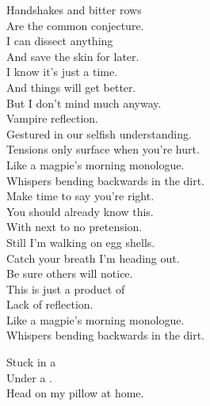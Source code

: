 


Handshakes and bitter rows \\
Are the common conjecture. \\
I can dissect anything \\
And save the skin for later. \\

I know it's just a time. \\
And things will get better. \\
But I don't mind much anyway. \\
Vampire reflection. \\

Gestured in our selfish understanding. \\
Tensions only surface when you're hurt. \\
Like a magpie's morning monologue. \\
Whispers bending backwards in the dirt. \\

Make time to say you're right. \\
You should already know this. \\
With next to no pretension. \\
Still I'm walking on egg shells. \\

Catch your breath I'm heading out. \\
Be sure others will notice. \\
This is just a product of \\
Lack of reflection. \\

Like a magpie's morning monologue. \\
Whispers bending backwards in the dirt. \\




Stuck in a  \\
Under a . \\
Head on my pillow at home. \\

